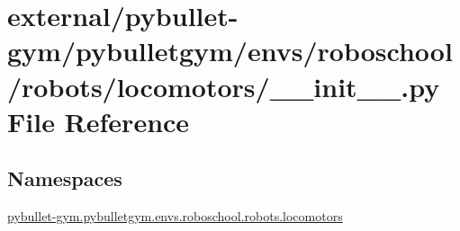 \hypertarget{external_2pybullet-gym_2pybulletgym_2envs_2roboschool_2robots_2locomotors_2____init_____8py}{}\section{external/pybullet-\/gym/pybulletgym/envs/roboschool/robots/locomotors/\+\_\+\+\_\+init\+\_\+\+\_\+.py File Reference}
\label{external_2pybullet-gym_2pybulletgym_2envs_2roboschool_2robots_2locomotors_2____init_____8py}
\subsection*{Namespaces}
\begin{DoxyCompactItemize}
\item 
 \hyperlink{namespacepybullet-gym_1_1pybulletgym_1_1envs_1_1roboschool_1_1robots_1_1locomotors}{pybullet-\/gym.\+pybulletgym.\+envs.\+roboschool.\+robots.\+locomotors}
\end{DoxyCompactItemize}
